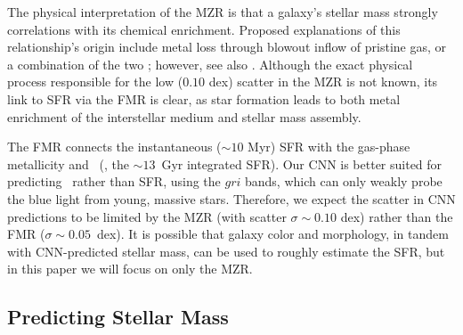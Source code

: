 \documentclass[fleqn,usenatbib]{mnras}
\begin{document}
The physical interpretation of the MZR is that a galaxy's stellar mass strongly correlations with its chemical enrichment. Proposed explanations of this relationship's origin include metal loss through blowout \citep[e.g.,][]{2002ApJ...581.1019G,Tremonti2004} inflow of pristine gas, or a combination of the two \citep[][]{2013ApJ...772..119L}; however, see also \cite{2013A&A...554A..58S}. Although the exact physical process responsible for the low ($0.10$ dex) scatter in the MZR is not known, its link to SFR via the FMR is clear, as star formation leads to both metal enrichment of the interstellar medium and stellar mass assembly.

The FMR connects the instantaneous ($\sim 10$ Myr) SFR with the gas-phase metallicity \citep[$\sim 1$~Gyr timescales; see, e.g.,][]{2011ApJ...734...48L} and \mstar\ (\ie, the $\sim 13$~Gyr integrated SFR). Our CNN is better suited for predicting \mstar\ rather than SFR, using the $gri$ bands, which can only weakly probe the blue light from young, massive stars. Therefore, we expect the scatter in CNN predictions to be limited by the MZR (with scatter $\sigma \sim 0.10$ dex) rather than the FMR ($\sigma \sim 0.05$~dex). It is possible that galaxy color and morphology, in tandem with CNN-predicted stellar mass, can be used to roughly estimate the SFR, but in this paper we will focus on only the MZR.


\subsection{Predicting Stellar Mass}
\end{document}
